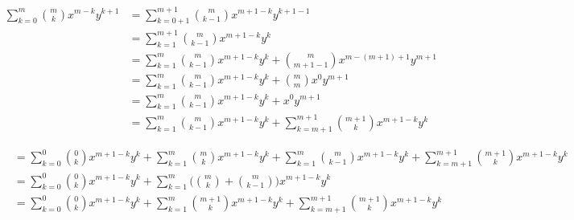   \begin{align*}
    \sum_{k=0}^{m} \binom{m}{k} x^{m-k}y^{k+1} &= \sum_{k=0+1}^{m+1} \binom{m}{k-1} x^{m+1-k}y^{k+1-1}\\
    &= \sum_{k=1}^{m+1} \binom{m}{k-1} x^{m+1-k}y^{k}\\
    &= \sum_{k=1}^{m} \binom{m}{k-1} x^{m+1-k}y^{k} + \binom{m}{m+1-1} x^{m-(m+1)+1}y^{m+1}\\
    &=  \sum_{k=1}^{m} \binom{m}{k-1} x^{m+1-k}y^{k} + \binom{m}{m} x^{0}y^{m+1}\\
    &= \sum_{k=1}^{m} \binom{m}{k-1} x^{m+1-k}y^{k} +  x^{0}y^{m+1}\\
    &= \sum_{k=1}^{m} \binom{m}{k-1} x^{m+1-k}y^{k} + \sum_{k=m+1}^{m+1} \binom{m+1}{k} x^{m+1-k} y^k
  \end{align*}
  
  \begin{align*}
    &= \sum_{k=0}^{0} \binom{0}{k} x^{m+1-k} y^k +\sum_{k=1}^{m} \binom{m}{k} x^{m+1-k}y^k + \sum_{k=1}^{m} \binom{m}{k-1} x^{m+1-k}y^{k} + \sum_{k=m+1}^{m+1} \binom{m+1}{k} x^{m+1-k} y^k\\
    &= \sum_{k=0}^{0} \binom{0}{k} x^{m+1-k} y^k +\sum_{k=1}^{m} \Biggl(\binom{m}{k} + \binom{m}{k-1}\Biggr) x^{m+1-k}y^k\\
    &= \sum_{k=0}^{0} \binom{0}{k} x^{m+1-k} y^k + \sum_{k=1}^{m} \binom{m+1}{k} x^{m+1-k}y^{k} + \sum_{k=m+1}^{m+1} \binom{m+1}{k} x^{m+1-k} y^k
  \end{align*}